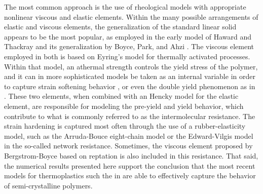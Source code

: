 The most common approach is the use of rheological models with appropriate nonlinear viscous and elastic elements.
Within the many possible arrangements of elastic and viscous elements, the generalization of the standard linear solid appears to be the most popular, as employed in the early model of Haward and Thackray \citep{hawardUseMathematicalModel1968} and its generalization by Boyce, Park, and Ahzi \citep{boyceLargeInelasticDeformation1988}.
The viscous element employed in both is based on Eyring's model for thermally activated processes.
Within that model, an athermal strength controls the yield stress of the polymer, and it can in more sophisticated models be taken as an internal variable in order to capture strain softening behavior \citep{boyceLargeInelasticDeformation1988}, or even the double yield phenomenon as in \citep{haoUnifiedAmorphousCrystalline2022}.
These two elements, when combined with an Hencky model for the elastic element, are responsible for modeling the pre-yield and yield behavior, which contribute to what is commonly referred to as the intermolecular resistance.
The strain hardening is captured most often through the use of a rubber-elasticity model, such as the Arruda-Bouce eight-chain model \citep{arrudaEffectsStrainRate1995} or the Edward-Vilgis model \citep{edwardsEffectEntanglementsRubber1986} in the so-called network resistance.
Sometimes, the viscous element proposed by Bergstrom-Boyce based on reptation \citep{bergstromConstitutiveModelingLarge1998, bergstromConstitutiveModelingTimedependent2001} is also included in this resistance.
That said, the numerical results presented here support the conclusion that the most recent models for thermoplastics such the in \cite{haoUnifiedAmorphousCrystalline2022} are able to effectively capture the behavior of semi-crystalline polymers.

